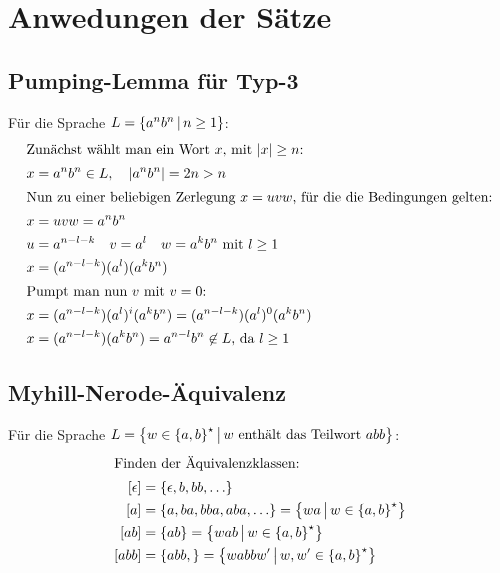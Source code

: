 \chapter{Anwedungen der Sätze}
\section{Pumping-Lemma für Typ-3}\label{bsp:pumpingLemma}
Für die Sprache $L=\left\{ a^nb^n \,\middle|\, n\geq 1 \right\}$:%
\begin{align*}
	\intertext{Zunächst wählt man ein Wort $x$, mit $|x|\geq n$:}
	x&=a^nb^n \in L,\quad |a^nb^n|=2n>n\\
	\intertext{Nun zu einer beliebigen Zerlegung $x=uvw$, für die die Bedingungen gelten:}
	x&=uvw=a^nb^n\\
	u&=a^{n-l-k} \quad v=a^l \quad w=a^k b^n \text{ mit $l\geq 1$}\\
	x&=(a^{n-l-k}) (a^l) (a^k b^n)\\
	\intertext{Pumpt man nun $v$ mit $v=0$:}
	x&=(a^{n-l-k}) (a^l)^i (a^k b^n)=(a^{n-l-k}) (a^l)^0 (a^k b^n)\\
	x&=(a^{n-l-k}) (a^k b^n) = a^{n-l} b^n \not\in L\text{, da $l\geq 1$}\\
\end{align*}
\section{Myhill-Nerode-Äquivalenz}\label{bsp:myhill}
Für die Sprache $L=\left\{ w\in\left\{ a,b \right\}^\star \,\middle|\, w \text{ enthält das Teilwort $abb$} \right\}$:%
\begin{align*}
	\intertext{Finden der Äquivalenzklassen:}
	[\epsilon]&=\left\{ \epsilon, b, bb, \ldots \right\}\\
	[a]&=\left\{ a, ba, bba, aba, \ldots \right\}=\left\{ wa \,\middle|\, w\in\left\{ a,b \right\}^\star \right\}\\
	[ab]&=\left\{ ab \right\}=\left\{ wab \,\middle|\, w\in\left\{ a,b \right\}^\star \right\}\\
	[abb]&=\left\{ abb,  \right\}=\left\{ wabbw' \,\middle|\, w,w'\in\left\{ a,b \right\}^\star \right\}
\end{align*}


